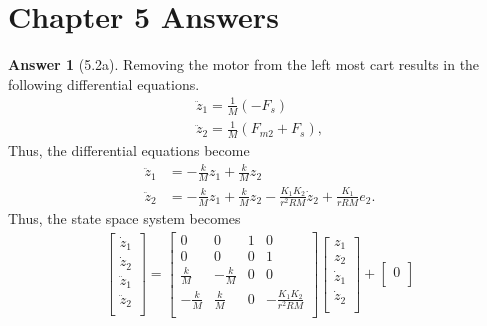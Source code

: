 \documentclass{article}
\theoremstyle{definition}
\newtheorem*{ans}{Answer}
\begin{document}
    \section*{Chapter 5 Answers}
    \begin{ans}[5.2a]
        Removing the motor from the left most cart results
        in the following differential equations.
        \begin{align*}
            \ddot z_1 = \frac{1}{M} \left( - F_s \right) \\
            \ddot z_2 = \frac{1}{M} \left( F_{m2} + F_s \right),
        \end{align*}
        Thus, the differential equations become
        \begin{align*}
            \ddot z_1 &= -\frac{k}{M} z_1 + \frac{k}{M} z_2 \\
            \ddot z_2 &= - \frac{k}{M} z_1 + \frac{k}{M}z_2 
            - \frac{K_1 K_2}{r^2 R M}\dot z_2 
            + \frac{K_1}{rRM} e_2.
        \end{align*}
        Thus, the state space system becomes
        \begin{align*}
            \begin{bmatrix}
                \dot z_1 \\
                \dot z_2 \\
                \ddot z_1 \\
                \ddot z_2 \\
            \end{bmatrix}
            =
            \begin{bmatrix}
                0 & 0 & 1 & 0 \\
                0 & 0 & 0 & 1 \\
                \frac{k}{M} & -\frac{k}{M} & 0 & 0 \\
                -\frac{k}{M} & \frac{k}{M} &  0 & -\frac{K_1 K_2}{r^2 R M} \\
            \end{bmatrix}
            \begin{bmatrix}
                z_1 \\
                z_2 \\
                \dot z_1 \\
                \dot z_2 \\
            \end{bmatrix}
            +
            \begin{bmatrix}
                0 \\

\end{bmatrix}
\end{align*}
\end{ans}
\end{document}
